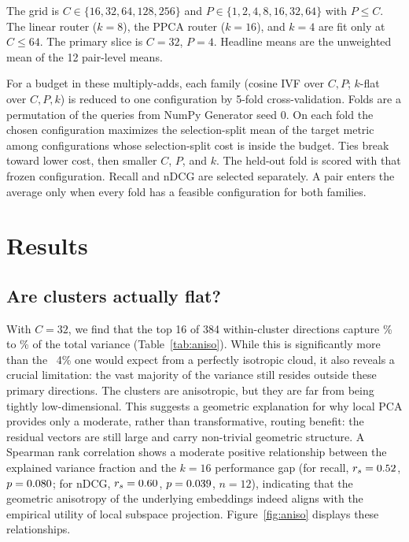 \documentclass[sigconf,nonacm]{acmart}
\begin{document}
The grid is $C \in \{16,32,64,128,256\}$ and $P \in \{1,2,4,8,16,32,64\}$ with $P \le C$. The linear router ($k = 8$), the PPCA router ($k = 16$), and $k = 4$ are fit only at $C \le 64$. The primary slice is $C = 32$, $P = 4$. Headline means are the unweighted mean of the 12 pair-level means.

For a budget in these multiply-adds, each family (cosine IVF over $C,P$; $k$-flat over $C,P,k$) is reduced to one configuration by 5-fold cross-validation. Folds are a permutation of the queries from NumPy Generator seed 0. On each fold the chosen configuration maximizes the selection-split mean of the target metric among configurations whose selection-split cost is inside the budget. Ties break toward lower cost, then smaller $C$, $P$, and $k$. The held-out fold is scored with that frozen configuration. Recall and nDCG are selected separately. A pair enters the average only when every fold has a feasible configuration for both families.

\section{Results}
\label{sec:results}

\subsection{Are clusters actually flat?}
\label{sec:structure}

With $C = 32$, we find that the top 16 of 384 within-cluster directions capture \ExplainedLo\% to \ExplainedHi\% of the total variance (Table~\ref{tab:aniso}). While this is significantly more than the ~4\% one would expect from a perfectly isotropic cloud, it also reveals a crucial limitation: the vast majority of the variance still resides outside these primary directions. The clusters are anisotropic, but they are far from being tightly low-dimensional. This suggests a geometric explanation for why local PCA provides only a moderate, rather than transformative, routing benefit: the residual vectors are still large and carry non-trivial geometric structure. A Spearman rank correlation shows a moderate positive relationship between the explained variance fraction and the $k=16$ performance gap (for recall, $r_s = 0.52$, $p = 0.080$; for nDCG, $r_s = 0.60$, $p = 0.039$, $n=12$), indicating that the geometric anisotropy of the underlying embeddings indeed aligns with the empirical utility of local subspace projection. Figure~\ref{fig:aniso} displays these relationships.
\end{document}

